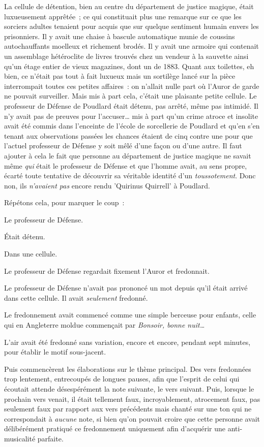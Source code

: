 La cellule de détention, bien au centre du département de justice magique, était luxueusement apprêtée~; ce qui constituait plus une remarque sur ce que les sorciers adultes tenaient pour acquis que sur quelque sentiment humain envers les prisonniers. Il y avait une chaise à bascule automatique munie de coussins autochauffants moelleux et richement brodés. Il y avait une armoire qui contenait un assemblage hétéroclite de livres trouvés chez un vendeur à la sauvette ainsi qu'un étage entier de vieux magazines, dont un de 1883. Quant aux toilettes, eh bien, ce n'était pas tout à fait luxueux mais un sortilège lancé sur la pièce interrompait toutes ces petites affaires~: on n'allait nulle part où l'Auror de garde ne pouvait surveiller. Mais mis à part cela, c'était une plaisante petite cellule. Le professeur de Défense de Poudlard était détenu, pas arrêté, même pas intimidé. Il n'y avait pas de preuves pour l'accuser… mis à part qu'un crime atroce et insolite avait été commis dans l'enceinte de l'école de sorcellerie de Poudlard et qu'en s'en tenant aux observations passées les chances étaient de cinq contre une pour que l'actuel professeur de Défense y soit mêlé d'une façon ou d'une autre. Il faut ajouter à cela le fait que personne au département de justice magique ne savait même \emph{qui} était le professeur de Défense et que l'homme avait, au sens propre, écarté toute tentative de découvrir sa véritable identité d'un \emph{toussotement}. Donc non, ils \emph{n'avaient pas} encore rendu 'Quirinus Quirrell' à Poudlard.

Répétons cela, pour marquer le coup~:

Le professeur de Défense.

Était détenu.

Dans une cellule.

Le professeur de Défense regardait fixement l'Auror et fredonnait.

Le professeur de Défense n'avait pas prononcé un mot depuis qu'il était arrivé dans cette cellule. Il avait \emph{seulement} fredonné.

Le fredonnement avait commencé comme une simple berceuse pour enfants, celle qui en Angleterre moldue commençait par \emph{Bonsoir, bonne nuit…}

L'air avait été fredonné sans variation, encore et encore, pendant sept minutes, pour établir le motif sous-jacent.

Puis commencèrent les élaborations sur le thème principal. Des vers fredonnées trop lentement, entrecoupés de longues pauses, afin que l'esprit de celui qui écoutait attende désespérément la note suivante, le vers suivant. Puis, lorsque le prochain vers venait, il était tellement faux, incroyablement, atrocement faux, pas seulement faux par rapport aux vers précédents mais chanté sur une ton qui ne correspondait à \emph{aucune} note, si bien qu'on pouvait croire que cette personne avait délibérément pratiqué ce fredonnement uniquement afin d'acquérir une anti-musicalité parfaite.


